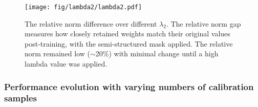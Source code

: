 \begin{table}[!t]
\centering
\caption{Wikitext PPL across $\lambda_{2}$. A broad optimal plateau suggests that performance remains stable across a robust range of $\lambda_{2}$.}
\label{tab: reg_2}
\vspace{0.5em}
\vspace{-1em}
\end{table}

\begin{figure}[!t]
    \centering
    \vspace{1em}
    \texttt{[image: fig/lambda2/lambda2.pdf]} %
    \caption{The relative norm difference over different $\lambda_{2}$. The relative norm gap measures how closely retained weights match their original values post-training, with the semi-structured mask applied. The relative norm remained low ($\sim$20\%) with minimal change until a high lambda value was applied.}
    \label{fig:lambda2}
\end{figure}
\subsubsection{Performance evolution with varying numbers of calibration samples}
\label{sec:calib}

